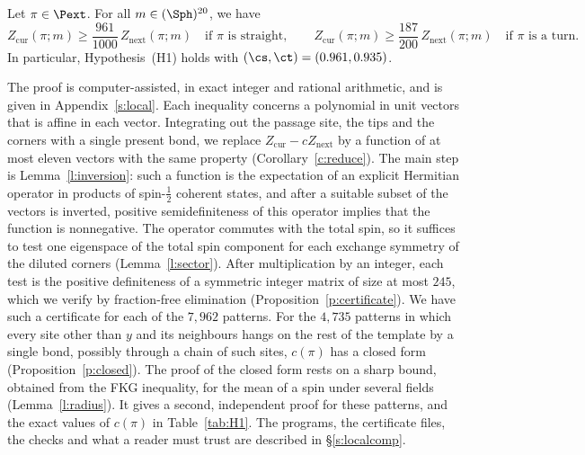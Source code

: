 \begin{theorem}\label{t:H1}
Let $\pi \in \Pext$. For all $m \in (\Sph)^{20}$, we have
\begin{equation*}
Z_{\mathrm{cur}}(\pi; m) \ge \frac{961}{1000} \, Z_{\mathrm{next}}(\pi; m) \quad \text{if } \pi \text{ is straight}, \qquad Z_{\mathrm{cur}}(\pi; m) \ge \frac{187}{200} \, Z_{\mathrm{next}}(\pi; m) \quad \text{if } \pi \text{ is a turn}.
\end{equation*}
In particular, Hypothesis~(H1) holds with $(\cs, \ct) = (0.961, 0.935)$.
\end{theorem}

The proof is computer-assisted, in exact integer and rational arithmetic, and is given in Appendix~\ref{s:local}. Each inequality concerns a polynomial in unit vectors that is affine in each vector. Integrating out the passage site, the tips and the corners with a single present bond, we replace $Z_{\mathrm{cur}} - c Z_{\mathrm{next}}$ by a function of at most eleven vectors with the same property (Corollary~\ref{c:reduce}). The main step is Lemma~\ref{l:inversion}: such a function is the expectation of an explicit Hermitian operator in products of spin-$\frac12$ coherent states, and after a suitable subset of the vectors is inverted, positive semidefiniteness of this operator implies that the function is nonnegative. The operator commutes with the total spin, so it suffices to test one eigenspace of the total spin component for each exchange symmetry of the diluted corners (Lemma~\ref{l:sector}). After multiplication by an integer, each test is the positive definiteness of a symmetric integer matrix of size at most $245$, which we verify by fraction-free elimination (Proposition~\ref{p:certificate}). We have such a certificate for each of the $7{,}962$ patterns. For the $4{,}735$ patterns in which every site other than $y$ and its neighbours hangs on the rest of the template by a single bond, possibly through a chain of such sites, $c(\pi)$ has a closed form (Proposition~\ref{p:closed}). The proof of the closed form rests on a sharp bound, obtained from the FKG inequality, for the mean of a spin under several fields (Lemma~\ref{l:radius}). It gives a second, independent proof for these patterns, and the exact values of $c(\pi)$ in Table~\ref{tab:H1}. The programs, the certificate files, the checks and what a reader must trust are described in \S\ref{s:localcomp}.

